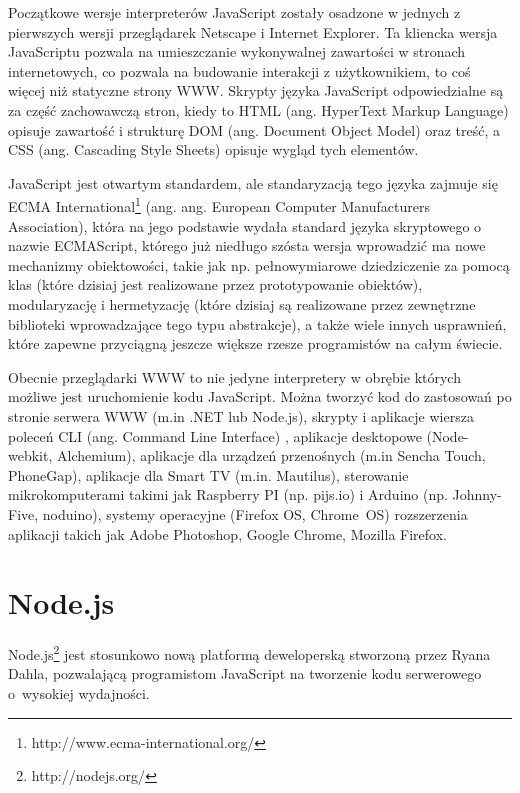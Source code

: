 \documentclass[twoside,a4paper,openright,12pt]{book}
\begin{document}
Początkowe wersje interpreterów JavaScript zostały osadzone w jednych z pierwszych wersji przeglądarek Netscape i Internet Explorer. Ta kliencka wersja JavaScriptu pozwala na umieszczanie wykonywalnej zawartości w stronach internetowych, co pozwala na budowanie interakcji z użytkownikiem, to coś więcej niż statyczne strony WWW. \cite{flanagan2002javascript} Skrypty języka JavaScript odpowiedzialne są za część zachowawczą stron, kiedy to HTML (ang. HyperText Markup Language) opisuje zawartość i strukturę DOM (ang. Document Object Model) oraz treść, a CSS (ang. Cascading Style Sheets) opisuje wygląd tych elementów.

JavaScript jest otwartym standardem, ale standaryzacją tego języka zajmuje się ECMA International\footnote{http://www.ecma-international.org/} (ang. ang. European Computer Manufacturers Association), która na jego podstawie wydała standard języka skryptowego o nazwie ECMAScript, którego już niedługo szósta wersja wprowadzić ma nowe mechanizmy obiektowości, takie jak np. pełnowymiarowe dziedziczenie za pomocą klas (które dzisiaj jest realizowane przez prototypowanie obiektów), modularyzację i hermetyzację (które dzisiaj są realizowane przez zewnętrzne biblioteki wprowadzające tego typu abstrakcje), a także wiele innych usprawnień, które zapewne przyciągną jeszcze większe rzesze programistów na całym świecie.

Obecnie przeglądarki WWW to nie jedyne interpretery w obrębie których możliwe jest uruchomienie kodu JavaScript. Można tworzyć kod do zastosowań po stronie serwera WWW (m.in .NET lub Node.js), skrypty i aplikacje wiersza poleceń CLI (ang. Command Line Interface) \cite{stefanov2012javascript}, aplikacje desktopowe (Node-webkit, Alchemium), aplikacje dla urządzeń przenośnych (m.in Sencha Touch, PhoneGap), aplikacje dla Smart TV (m.in. Mautilus), sterowanie mikrokomputerami takimi jak Raspberry PI (np. pijs.io) i Arduino (np. Johnny-Five, noduino), systemy operacyjne (Firefox OS, Chrome~OS) rozszerzenia aplikacji takich jak Adobe Photoshop, Google Chrome, Mozilla Firefox.


\section{Node.js}

Node.js\footnote{http://nodejs.org/} jest stosunkowo nową platformą deweloperską stworzoną przez Ryana Dahla, pozwalającą programistom JavaScript na tworzenie kodu serwerowego o~wysokiej wydajności. \cite{means2012node} \cite{powers2012learning}
\end{document}

